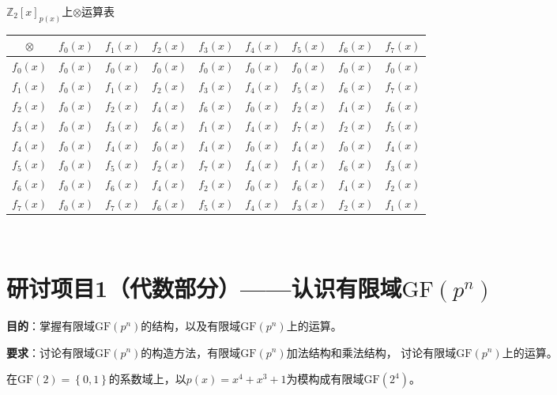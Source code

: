 \begin{Solution}
        \centering
        \makeatletter{}\makeatother\caption{$\mathbb{Z}_2[x]_{p(x)}$上$\otimes$运算表}
        \begin{tabular}{|c|c|c|c|c|c|c|c|c|}
        \hline
        $\otimes$  & $f_0(x)$  & $f_1(x)$  & $f_2(x)$ &  $f_3(x)$ &  $f_4(x)$ &  $f_5(x)$ &  $f_6(x)$ &  $f_7(x)$\\ \hline
        $f_0(x)$  & $f_0(x)$  & $f_0(x)$  & $f_0(x)$ &  $f_0(x)$ &  $f_0(x)$ &  $f_0(x)$ &  $f_0(x)$ &  $f_0(x)$\\ \hline
        $f_1(x)$  & $f_0(x)$  & $f_1(x)$  & $f_2(x)$ &  $f_3(x)$ &  $f_4(x)$ &  $f_5(x)$ &  $f_6(x)$ &  $f_7(x)$\\ \hline
        $f_2(x)$  & $f_0(x)$  & $f_2(x)$  & $f_4(x)$ &  $f_6(x)$ &  $f_0(x)$ &  $f_2(x)$ &  $f_4(x)$ &  $f_6(x)$\\ \hline
        $f_3(x)$  & $f_0(x)$  & $f_3(x)$  & $f_6(x)$ &  $f_1(x)$ &  $f_4(x)$ &  $f_7(x)$ &  $f_2(x)$ &  $f_5(x)$\\ \hline
        $f_4(x)$  & $f_0(x)$  & $f_4(x)$  & $f_0(x)$ &  $f_4(x)$ &  $f_0(x)$ &  $f_4(x)$ &  $f_0(x)$ &  $f_4(x)$\\ \hline
        $f_5(x)$  & $f_0(x)$  & $f_5(x)$  & $f_2(x)$ &  $f_7(x)$ &  $f_4(x)$ &  $f_1(x)$ &  $f_6(x)$ &  $f_3(x)$\\ \hline
        $f_6(x)$  & $f_0(x)$  & $f_6(x)$  & $f_4(x)$ &  $f_2(x)$ &  $f_0(x)$ &  $f_6(x)$ &  $f_4(x)$ &  $f_2(x)$\\ \hline
        $f_7(x)$  & $f_0(x)$  & $f_7(x)$  & $f_6(x)$ &  $f_5(x)$ &  $f_4(x)$ &  $f_3(x)$ &  $f_2(x)$ &  $f_1(x)$\\ \hline
        \end{tabular}
\\
\end{Solution}

\newpage
\chapter{研讨项目1（代数部分）——认识有限域$\mathrm{GF}(p^n)$}

\textbf{目的}：掌握有限域$\mathrm{GF}(p^n)$的结构，以及有限域$\mathrm{GF}(p^n)$上的运算。

\textbf{要求}：讨论有限域$\mathrm{GF}(p^n)$的构造方法，有限域$\mathrm{GF}(p^n)$加法结构和乘法结构，
讨论有限域$\mathrm{GF}(p^n)$上的运算。


在$\mathrm{GF}(2)=\left\{0,1\right\}$的系数域上，以$p(x)=x^4+x^3+1$为模构成有限域$\mathrm{GF}(2^4)$。

